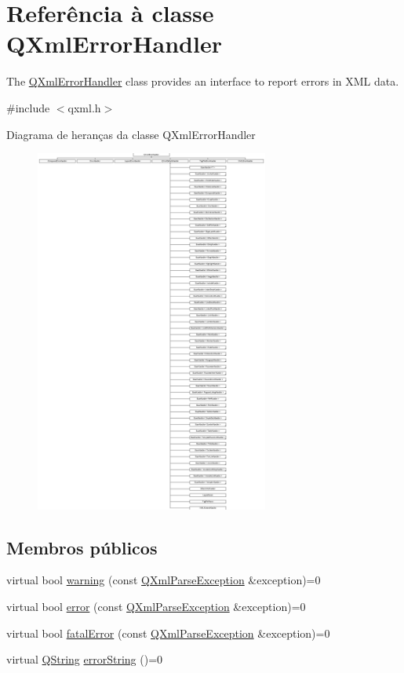 \hypertarget{class_q_xml_error_handler}{\section{Referência à classe Q\-Xml\-Error\-Handler}
\label{class_q_xml_error_handler}
}


The \hyperlink{class_q_xml_error_handler}{Q\-Xml\-Error\-Handler} class provides an interface to report errors in X\-M\-L data.  




{\ttfamily \#include $<$qxml.\-h$>$}

Diagrama de heranças da classe Q\-Xml\-Error\-Handler\begin{figure}[H]
\begin{center}
\leavevmode
\includegraphics[height=12.000000cm]{class_q_xml_error_handler}
\end{center}
\end{figure}
\subsection*{Membros públicos}
\begin{DoxyCompactItemize}
\item 
virtual bool \hyperlink{class_q_xml_error_handler_a109de9b8833092a63f6bc48f84cf241b}{warning} (const \hyperlink{class_q_xml_parse_exception}{Q\-Xml\-Parse\-Exception} \&exception)=0
\item 
virtual bool \hyperlink{class_q_xml_error_handler_a4c3f6f44d2411175c39b0a1f45075a91}{error} (const \hyperlink{class_q_xml_parse_exception}{Q\-Xml\-Parse\-Exception} \&exception)=0
\item 
virtual bool \hyperlink{class_q_xml_error_handler_ac797351a210314f1ca2289a40acf2694}{fatal\-Error} (const \hyperlink{class_q_xml_parse_exception}{Q\-Xml\-Parse\-Exception} \&exception)=0
\item 
virtual \hyperlink{class_q_string}{Q\-String} \hyperlink{class_q_xml_error_handler_ac86bbbabef3a52aec7615cbbc0adb3f4}{error\-String} ()=0
\end{DoxyCompactItemize}



